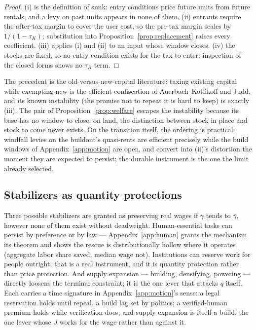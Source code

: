 \documentclass[12pt]{article}
\theoremstyle{plain}
\begin{document}
\begin{proof}
(i) is the definition of sunk: entry conditions price future units from future rentals, and a levy on past units appears in none of them. (ii) entrants require the after-tax margin to cover the user cost, so the pre-tax margin scales by $1/(1-\tau _K)$; substitution into Proposition~\ref{prop:replacement} raises every coefficient. (iii) applies (i) and (ii) to an input whose window closes. (iv) the stocks are fixed, so no entry condition exists for the tax to enter; inspection of the closed forms shows no $\tau _R$ term.
\end{proof}

The precedent is the old-versus-new-capital literature: taxing existing capital while exempting new is the efficient confiscation of Auerbach--Kotlikoff and Judd, and its known instability (the promise not to repeat it is hard to keep) is exactly (iii). The pair of Proposition~\ref{prop:welfare} escapes the instability because its base has no window to close: on land, the distinction between stock in place and stock to come never exists. On the transition itself, the ordering is practical: windfall levies on the buildout's quasi-rents are efficient precisely while the build windows of Appendix~\ref{app:motion} are open, and convert into (ii)'s distortion the moment they are expected to persist; the durable instrument is the one the limit already selected.

\subsection{Stabilizers as quantity protections}\label{sec:stabilizers}

Three possible stabilizers are granted as preserving real wages if $\gamma$ tends to $\bar{\gamma}$, however none of them exist without deadweight. Human-essential tasks can persist by preference or by law --- Appendix~\ref{app:human} grants the mechanism its theorem and shows the rescue is distributionally hollow where it operates (aggregate labor share saved, median wage not). Institutions can reserve work for people outright; that is a real instrument, and it is quantity protection rather than price protection. And supply expansion --- building, densifying, powering --- directly loosens the terminal constraint; it is the one lever that attacks $q$ itself. Each carries a time signature in Appendix~\ref{app:motion}'s sense: a legal reservation holds until repeal, a build lag set by politics; a verified-human premium holds while verification does; and supply expansion is itself a build, the one lever whose $J$ works for the wage rather than against it.
\end{document}
